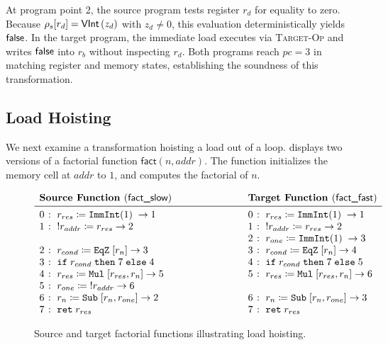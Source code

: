\documentclass[report.tex]{subfiles}
\begin{document}
At program point 2,
the source program tests register $r_d$ for equality to zero.
Because $\getreg{r_d}{\rho_s} = \VInt{z_d}$ with $z_d \neq 0$,
this evaluation deterministically yields $\false$.
In the target program,
the immediate load executes via \textsc{Target-Op}
and writes $\false$ into $r_b$ without inspecting $r_d$.
Both programs reach $pc = 3$ in matching register and memory states,
establishing the soundness of this transformation.

\subsection{Load Hoisting}
\label{sec:case-study-hoisting}

We next examine a transformation hoisting a load out of a loop.
 displays two versions of a factorial function
$\textsf{fact}(n, addr)$.
The function initializes the memory cell at $addr$ to $1$,
and computes the factorial of $n$.

\begin{figure}[htp]
  \centering
  \begin{equation*}
    \begin{array}{r@{\;\colon\;}l c r@{\;\colon\;}l}
      \multicolumn{2}{c}{\textbf{Source Function } (\textsf{fact\_slow})}
      & \hspace{2cm}
      & \multicolumn{2}{c}{\textbf{Target Function } (\textsf{fact\_fast})}
      \\
      \midrule
      0 & \Iop{r_{res}}{\Oimmint{1}}{}{1}
      &
      & 0 & \Iop{r_{res}}{\Oimmint{1}}{}{1}
      \\
      1 & \Istore{r_{addr}}{r_{res}}{2}
      &
      & 1 & \Istore{r_{addr}}{r_{res}}{2}
      \\
      \multicolumn{2}{c}{}
      &
      & 2 & \Iop{r_{one}}{\Oimmint{1}}{}{3}
      \\
      2 & \Iop{r_{cond}}{\Oeqz}{[r_n]}{3}
      &
      & 3 & \Iop{r_{cond}}{\Oeqz}{[r_n]}{4}
      \\
      3 & \Icond{r_{cond}}{7}{4}
      &
      & 4 & \Icond{r_{cond}}{7}{5}
      \\
      4 & \Iop{r_{res}}{\Omul}{[r_{res}, r_n]}{5}
      &
      & 5 & \Iop{r_{res}}{\Omul}{[r_{res}, r_n]}{6}
      \\
      5 & \Iload{r_{one}}{r_{addr}}{6}
      &
      & \multicolumn{2}{c}{}
      \\
      6 & \Iop{r_n}{\Osub}{[r_n, r_{one}]}{2}
      &
      & 6 & \Iop{r_n}{\Osub}{[r_n, r_{one}]}{3}
      \\
      7 & \Iret{r_{res}}
      &
      & 7 & \Iret{r_{res}}
    \end{array}
  \end{equation*}
  \caption{Source and target factorial functions illustrating load hoisting.}
  \label{fig:fact-programs}
\end{figure}
\end{document}
